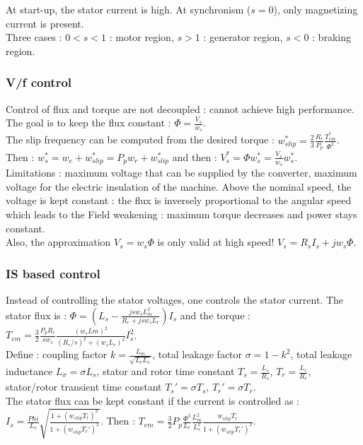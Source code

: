 \documentclass[../main.tex]{subfiles}
\begin{document}
\warning At start-up, the stator current is high. At synchronism ($s=0$), only magnetizing current is present. \\
Three cases : $0<s<1$ : motor region, $s>1$ : generator region, $s<0$ : braking region.\\

\subsubsection{V/f control}
Control of flux and torque are not decoupled : cannot achieve high performance.\\
The goal is to keep the flux constant : $\Phi = \frac{V_s}{w_s}$. \\
The slip frequency can be computed from the desired torque : $w_{slip}^* = \frac{2}{3} \frac{R_r}{P_p} \frac{T_{em}^*}{\Phi^2}$. Then : $w_s^* = w_e + w_{slip}^* = P_p w_r + w_{slip}^*$ and then : $V_s^* = \Phi w_s^* = \frac{V_s}{w_s} w_s^*$.\\

Limitations : maximum voltage that can be supplied by the converter, maximum voltage for the electric insulation of the machine. Above the nominal speed, the voltage is kept constant : the flux is inversely proportional to the angular speed which leads to the Field weakening : maximum torque decreases and power stays constant.\\
Also, the approximation $V_s = w_s \Phi$ is only valid at high speed! $V_s = R_s I_s + jw_s \Phi$.

\subsubsection{IS based control}
Instead of controlling the stator voltages, one controls the stator current. The stator flux is : $\Phi = (L_s - \frac{js w_s L_m^2}{R_r + js w_s L_r}) I_s$ and the torque : $T_{em} = \frac{3}{2} \frac{P_p R_r}{s w_s} \frac{(w_sLm)^2}{(R_r/s)^2 + (w_s L_r)^2} I_s^2$. \\
Define : coupling factor $k = \frac{L_m}{\sqrt{L_r L_s}}$, total leakage factor $\sigma = 1-k^2$, total leakage inductance $L_\sigma = \sigma L_s$, stator and rotor time constant $T_s = \frac{L_s}{R_s}$, $T_r = \frac{L_r}{R_r}$, stator/rotor transient time constant $T_s' = \sigma T_s$, $T_r' = \sigma T_r$.\\
The stator flux can be kept constant if the current is controlled as : $I_s = \frac{Phi}{L_s} \sqrt{\frac{1+(w_{slip} T_r)^2}{1+(w_{slip} T_r')^2}}$. Then : $T_{em} = \frac{3}{2} P_p \frac{\Phi^2}{L_r} \frac{L_m^2}{L_s^2} \frac{w_{slip} T_r}{1+(w_{slip} T_r')^2}$.\\
\end{document}
